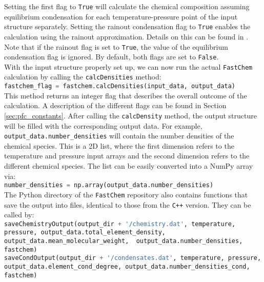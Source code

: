 \documentclass[numbers=noenddot]{aux/fcmanual}
\newcommand{\fc}{\texttt{FastChem}\xspace}
\newcommand{\cpp}{\ttt{C++}\xspace}
\newcommand{\ttt}[1]{\texttt {#1}}
\begin{document}
Setting the first flag to \verb|True| will calculate the chemical composition assuming equilibrium condensation for each temperature-pressure point of the input structure separately. Setting the rainout condensation flag to \verb|True| enables the calculation using the rainout approximation. Details on this can be found in \citet{Kitzmann2023inprep}. Note that if the rainout flag is set to \verb|True|, the value of the equilibrium condensation flag is ignored. By default, both flags are set to \verb|False|.\\


With the input structure properly set up, we can now run the actual \fc calculation by calling the \lstinline[language=Python]!calcDensities! method:\\

\lstinline[language=Python]!fastchem_flag = fastchem.calcDensities(input_data, output_data)!\\

This method returns an integer flag that describes the overall outcome of the calculation. A description of the different flags can be found in Section \ref{sec:pfc_constants}. After calling the \lstinline[language=Python]!calcDensity! method, the output structure will be filled with the corresponding output data. For example, \\
\lstinline[language=Python]!output_data.number_densities!
will contain the number densities of the chemical species. This is a 2D list, where the first dimension refers to the temperature and pressure input arrays and the second dimension refers to the different chemical species. The list can be easily converted into a NumPy array via:\\

\lstinline[language=Python]!number_densities = np.array(output_data.number_densities)!\\

The Python directory of the \fc repository also contains functions that save the output into files, identical to those from the \cpp version. They can be called by:\\

\lstinline[language=Python, breaklines, breakatwhitespace]!saveChemistryOutput(output_dir + '/chemistry.dat', temperature, pressure, output_data.total_element_density, output_data.mean_molecular_weight,  output_data.number_densities, fastchem)!\\

\lstinline[language=Python, breaklines, breakatwhitespace]!saveCondOutput(output_dir + '/condensates.dat', temperature, pressure, output_data.element_cond_degree, output_data.number_densities_cond, fastchem)!\\
\end{document}
